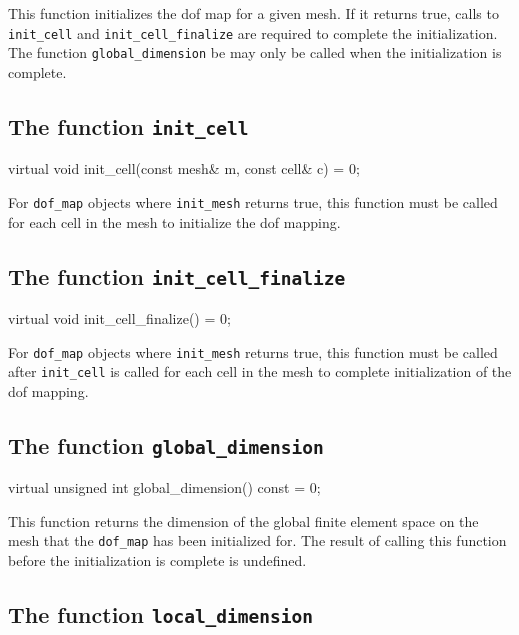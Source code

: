 This function initializes the dof map for a given mesh. If it returns
true, calls to \texttt{init\_cell} and \texttt{init\_cell\_finalize}
are required to complete the initialization. The function
\texttt{global\_dimension} be may only be called when the
initialization is complete.

\subsection{The function \texttt{init\_cell}}

\begin{code}
virtual void init_cell(const mesh& m,
                       const cell& c) = 0;
\end{code}

For \texttt{dof\_map} objects where \texttt{init\_mesh} returns true,
this function must be called for each cell in the mesh to initialize
the dof mapping.

\subsection{The function \texttt{init\_cell\_finalize}}

\begin{code}
virtual void init_cell_finalize() = 0;
\end{code}

For \texttt{dof\_map} objects where \texttt{init\_mesh} returns true,
this function must be called after \texttt{init\_cell} is called for
each cell in the mesh to complete initialization of the dof mapping.

\subsection{The function \texttt{global\_dimension}}

\begin{code}
virtual unsigned int global_dimension() const = 0;
\end{code}

This function returns the dimension of the global finite element space
on the mesh that the \texttt{dof\_map} has been initialized for. The
result of calling this function before the initialization is complete
is undefined.

\subsection{The function \texttt{local\_dimension}}

